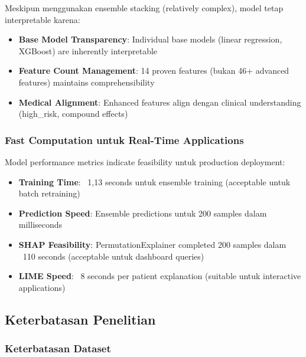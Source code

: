 Meskipun menggunakan ensemble stacking (relatively complex), model tetap interpretable karena:

\begin{itemize}
    \item \textbf{Base Model Transparency}: Individual base models (linear regression, XGBoost) are inherently interpretable
    \item \textbf{Feature Count Management}: 14 proven features (bukan 46+ advanced features) maintains comprehensibility
    \item \textbf{Medical Alignment}: Enhanced features align dengan clinical understanding (high\_risk, compound effects)
\end{itemize}

\subsubsection{Fast Computation untuk Real-Time Applications}

Model performance metrics indicate feasibility untuk production deployment:

\begin{itemize}
    \item \textbf{Training Time}: ~1,13 seconds untuk ensemble training (acceptable untuk batch retraining)
    \item \textbf{Prediction Speed}: Ensemble predictions untuk 200 samples dalam milliseconds
    \item \textbf{SHAP Feasibility}: PermutationExplainer completed 200 samples dalam ~110 seconds (acceptable untuk dashboard queries)
    \item \textbf{LIME Speed}: ~8 seconds per patient explanation (suitable untuk interactive applications)
\end{itemize}

\subsection{Keterbatasan Penelitian}
\label{subsec:keterbatasan}

\subsubsection{Keterbatasan Dataset}

